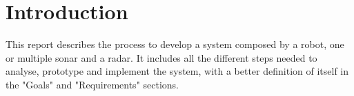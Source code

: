 \section{Introduction}
This report describes the process to develop a system composed by a robot, one or multiple sonar and a radar. It includes all the different steps needed to analyse, prototype and implement the system, with a better definition of itself in the "Goals" and "Requirements" sections.